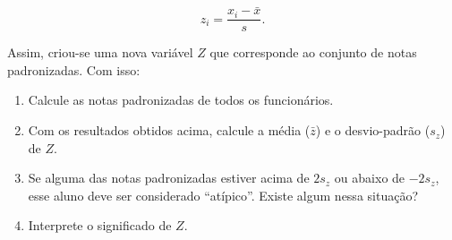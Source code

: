\documentclass[]{article}
\providecommand{\tightlist}{%
  \setlength{\itemsep}{0pt}\setlength{\parskip}{0pt}}
\begin{document}
\[z_i = \frac{x_i - \bar x}{s}.\]

Assim, criou-se uma nova variável \(Z\) que corresponde ao conjunto de
notas padronizadas. Com isso:

\begin{enumerate}
\def\labelenumi{(\alph{enumi})}
\tightlist
\item
  Calcule as notas padronizadas de todos os funcionários.
\item
  Com os resultados obtidos acima, calcule a média (\(\bar z\)) e o
  desvio-padrão (\(s_z\)) de \(Z\).
\item
  Se alguma das notas padronizadas estiver acima de \(2s_z\) ou abaixo
  de \(-2s_z\), esse aluno deve ser considerado ``atípico''. Existe
  algum nessa situação?
\item
  Interprete o significado de \(Z\).
\end{enumerate}
\end{document}
